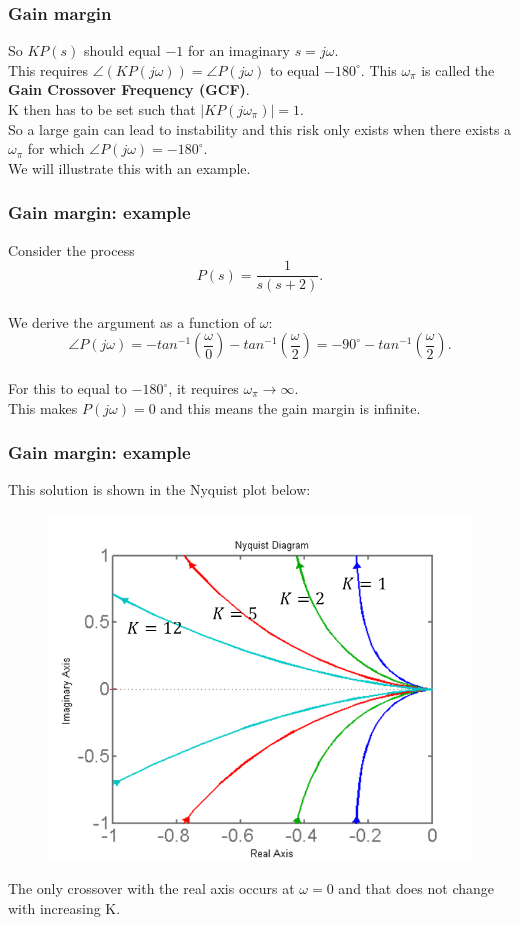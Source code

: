 \begin{frame}
	\frametitle{Gain margin}
	\vspace{-5ex}
	So $KP(s)$ should equal $-1$ for an imaginary $s=j\omega$.\\
	\bigskip
	This requires $\angle(KP(j\omega))=\angle P(j\omega)$ to equal $-180^{\circ}$. This $\omega_\pi$ is called the \textbf{Gain Crossover Frequency (GCF)}.\\
	K then has to be set such that $\big|KP(j\omega_\pi)\big|=1$.\\
	\bigskip
	So a large gain can lead to instability and this risk only exists when there exists a $\omega_\pi$ for which $\angle P(j\omega)=-180^{\circ}$.\\
	\medskip
	We will illustrate this with an example.
\end{frame}

\begin{frame}
	\frametitle{Gain margin: example}
	\vspace{-4ex}
	Consider the process $$P(s)=\frac{1}{s(s+2)}.$$\\
	We derive the argument as a function of $\omega$: $$\angle P(j\omega)=-tan^{-1}(\frac{\omega}{0})-tan^{-1}(\frac{\omega}{2})=-90^{\circ}-tan^{-1}(\frac{\omega}{2}).$$\\
	For this to equal to $-180^{\circ}$, it requires $\omega_\pi \rightarrow \infty$.\\ This makes $P(j\omega)=0$ and this means the gain margin is infinite.
\end{frame}

\begin{frame}
	\frametitle{Gain margin: example}
	This solution is shown in the Nyquist plot below:
	\vspace{-2ex}
	\begin{figure}
		\includegraphics[width=0.6\linewidth]{gain_example}
	\end{figure}
	\vspace{-2ex}
	The only crossover with the real axis occurs at $\omega=0$ and that does not change with increasing K.
\end{frame}

